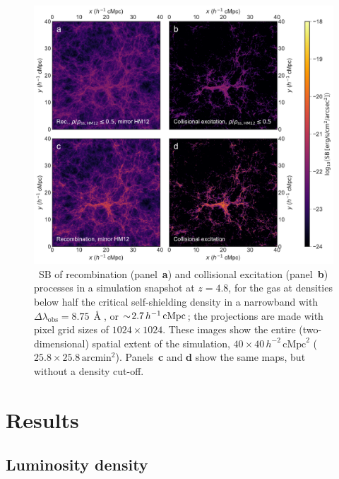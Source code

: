 \begin{figure}
    \centering
    \includegraphics[width=\linewidth]{"Plots/ChapterP/Recombination_collisional_excitation_maps"}
    \caption[\lya\ surface brightness of recombination and collisional excitation processes at $z=4.8$]
    {\lya\ SB of recombination (panel~\textbf{a}) and collisional excitation (panel~\textbf{b}) processes in a simulation snapshot at $z=4.8$, for the gas at densities below half the critical self-shielding density in a narrowband with $\Delta \lambda_\text{obs} = 8.75 \, \Angstrom$, or $\sim \! 2.7 \, h^{-1} \, \mathrm{cMpc}$; the projections are made with pixel grid sizes of $1024 \times 1024$. These images show the entire (two-dimensional) spatial extent of the simulation, $40 \times 40 \, h^{-2} \, \mathrm{cMpc}^2$ ($25.8 \times 25.8 \, \mathrm{arcmin}^2$). Panels~\textbf{c} and \textbf{d} show the same maps, but without a density cut-off.}
    \label{chPfig:SBrecexc}
\end{figure}

\section{Results}
\label{chPsec:Results}

\subsection{Luminosity density}
\label{chPssec:Luminosity density}

